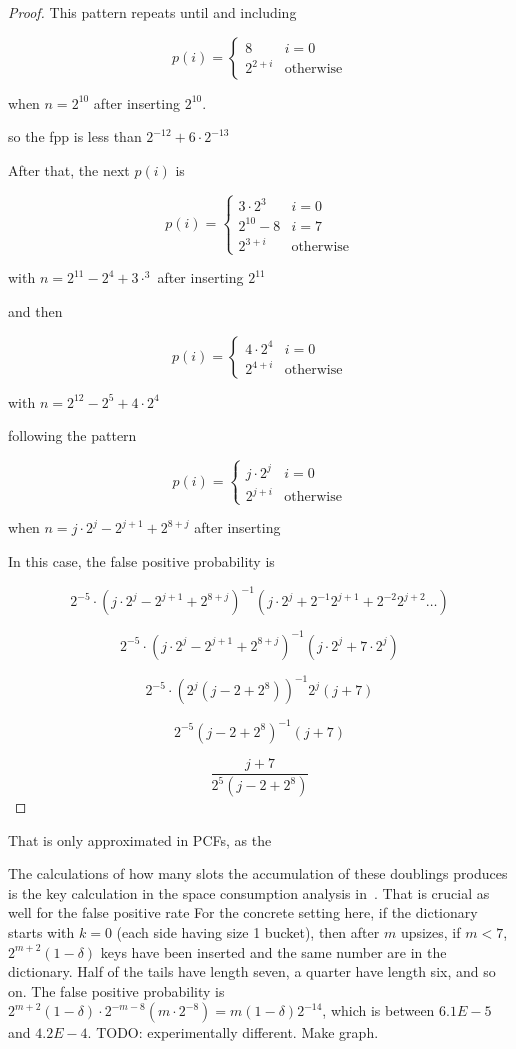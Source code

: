\documentclass[letterpaper, 11pt]{article}
\begin{document}
\begin{proof}
This pattern repeats until and including

\[
p(i) =
\begin{cases}
8 & i = 0\\
2^{2+i} & \text{otherwise}
\end{cases}
\]

when $n = 2^{10}$ after inserting $2^10$.

so the fpp is less than $2^{-12} + 6 \cdot 2^{-13}$

After that, the next $p(i)$ is

\[
p(i) =
\begin{cases}
3 \cdot 2^3 & i = 0\\
2^{10} - 8 & i = 7 \\
2^{3+i} & \text{otherwise}
\end{cases}
\]

with $n = 2^{11} - 2^4 + 3 \cdot ^3$ after inserting $2^11$

and then

\[
p(i) =
\begin{cases}
4 \cdot 2^4 & i = 0\\
2^{4+i} & \text{otherwise}
\end{cases}
\]

with $n = 2^{12} - 2^5 + 4 \cdot 2^4$


following the pattern

\[
p(i) =
\begin{cases}
j \cdot 2^j & i = 0\\
2^{j+i} & \text{otherwise}
\end{cases}
\]

when $n = j \cdot 2^j - 2^{j+1} + 2^{8+j}$ after inserting

In this case, the false positive probability is 

\[
2^{-5} \cdot (j \cdot 2^j - 2^{j+1} + 2^{8+j})^{-1}(j \cdot 2^j + 2^{-1}2^{j+1} + 2^{-2}2^{j+2} \dots)
\]

\[
2^{-5} \cdot (j \cdot 2^j - 2^{j+1} + 2^{8+j})^{-1}(j \cdot 2^j + 7\cdot2^j)
\]

\[
2^{-5} \cdot (2^j(j - 2 + 2^8))^{-1}2^j(j + 7)
\]

\[
2^{-5} (j - 2 + 2^8)^{-1}(j + 7)
\]

\[
\frac{j+7}{2^5 (j - 2 + 2^8)}
\]

\end{proof}

That is only approximated in PCFs, as the 

The calculations of how many slots the accumulation of these doublings produces is the key calculation in the space consumption analysis in~\cite{psw}.
That is crucial as well for the false positive rate
For the concrete setting here, if the dictionary starts with $k = 0$ (each side having size 1 bucket), then after $m$ upsizes, if $m < 7$, $2^{m+2}(1 - \delta)$ keys have been inserted and the same number are in the dictionary.
Half of the tails have length seven, a quarter have length six, and so on.
The false positive probability is $2^{m+2}(1 - \delta) \cdot 2^{-m-8}(m \cdot 2^{-8}) = m(1-\delta)2^{-14}$, which is between $6.1E-5$ and $4.2E-4$.
TODO: experimentally different. Make graph.
\end{document}

